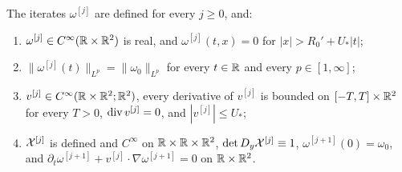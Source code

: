 \begin{lemma}
\label{lem:iterates}
The iterates $\omega^{[j]}$ are defined for every $j\ge0$, and:
\begin{enumerate}[label=\textup{(\roman*)}]
\item $\omega^{[j]}\in C^\infty(\mathbb{R}\times\mathbb{R}^2)$ is real, and $\omega^{[j]}(t,x)=0$
  for $|x|>R_0'+U_*|t|$;
\item $\|\omega^{[j]}(t)\|_{L^p}=\|\omega_0\|_{L^p}$ for every $t\in\mathbb{R}$ and every
  $p\in[1,\infty]$;
\item $v^{[j]}\in C^\infty(\mathbb{R}\times\mathbb{R}^2;\mathbb{R}^2)$, every derivative of $v^{[j]}$ is
  bounded on $[-T,T]\times\mathbb{R}^2$ for every $T>0$, $\operatorname{div} v^{[j]}=0$, and
  $|v^{[j]}|\le U_*$;
\item $\mathcal{X}^{[j]}$ is defined and $C^\infty$ on $\mathbb{R}\times\mathbb{R}\times\mathbb{R}^2$,
  $\det D_y\mathcal{X}^{[j]}\equiv1$, $\omega^{[j+1]}(0)=\omega_0$, and
  $\partial_t\omega^{[j+1]}+v^{[j]}\cdot\nabla\omega^{[j+1]}=0$ on $\mathbb{R}\times\mathbb{R}^2$.
\end{enumerate}
\end{lemma}

